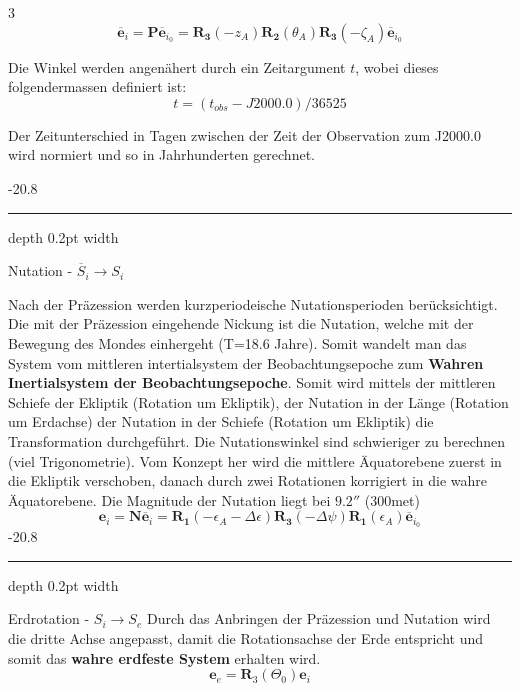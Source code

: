 \documentclass[9pt, landscape, fleqn]{scrartcl}
\makeatletter
\renewcommand{\subsubsection}{\@startsection{subsubsection}{1}{0mm}%
{-2\baselineskip}{0.8\baselineskip}%
{\hrule depth 0.2pt width\columnwidth\vspace*{1.2em}\normalsize\bfseries\rmfamily}}
\makeatother
\begin{document}
\begin{multicols*}{3}
\begin{equation*}
    \mathbf{\overline{e}}_i = \mathbf{P} \mathbf{\overline{e}}_{i_0} = \mathbf{R_3}(-z_A)\mathbf{R_2}(\theta_A) \mathbf{R_3}(-\zeta_A) \mathbf{\overline{e}}_{i_0}
\end{equation*}

Die Winkel werden angenähert durch ein Zeitargument $t$, wobei dieses folgendermassen definiert ist:
\begin{equation*}
    t = (t_{obs}-J2000.0) / 36525
\end{equation*}

Der Zeitunterschied in Tagen zwischen der Zeit der Observation zum J2000.0 wird normiert und so in Jahrhunderten gerechnet.

\subsubsection{Nutation - $\overline{S}_{i} \rightarrow S_i$}

Nach der Präzession werden kurzperiodeische Nutationsperioden berücksichtigt. Die mit der Präzession eingehende Nickung ist die Nutation, welche mit der Bewegung des Mondes einhergeht (T=18.6 Jahre). Somit wandelt man das System vom mittleren intertialsystem der Beobachtungsepoche zum \textbf{Wahren Inertialsystem der Beobachtungsepoche}.
Somit wird mittels der mittleren Schiefe der Ekliptik (Rotation um Ekliptik), der Nutation in der Länge (Rotation um Erdachse) der Nutation in der Schiefe (Rotation um Ekliptik) die Transformation durchgeführt. Die Nutationswinkel sind schwieriger zu berechnen (viel Trigonometrie). Vom Konzept her wird die mittlere Äquatorebene zuerst in die Ekliptik verschoben, danach durch zwei Rotationen korrigiert in die wahre Äquatorebene. Die Magnitude der Nutation liegt bei $9.2''$ (300met)
\begin{equation*}
    \mathbf{e}_i = \mathbf{N} \mathbf{\overline{e}}_{i} = \mathbf{R_1}(-\epsilon_A-\Delta \epsilon)\mathbf{R_3}(-\Delta \psi) \mathbf{R_1}(\epsilon_A) \mathbf{\overline{e}}_{i_0}
\end{equation*}
\subsubsection{Erdrotation - $S_i \rightarrow S_e$}
Durch das Anbringen der Präzession und Nutation wird die dritte Achse angepasst, damit die Rotationsachse der Erde entspricht und somit das \textbf{wahre erdfeste System} erhalten wird.
\begin{equation*}
    \mathbf{e}_e = \mathbf{R}_3(\Theta_0) \mathbf{e}_{i} 
\end{equation*}


\end{multicols*}
\end{document}
